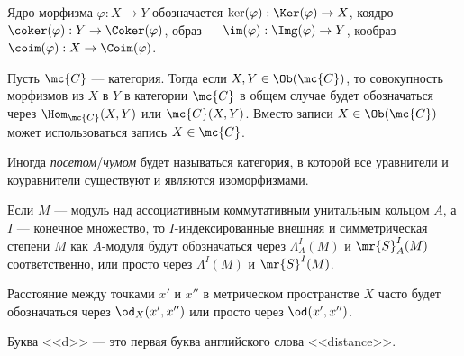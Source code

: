 \documentclass[
	extrafontsizes,
	11pt,
	hyphens,
]{memoir}
\begin{document}
\begin{notation}
Ядро морфизма \(\varphi : X \to Y\) обозначается \(\ker(\varphi) : \Ker(\varphi) \to X\),
коядро --- \(\coker(\varphi) : Y \to \Coker(\varphi)\),
образ --- \(\im(\varphi) : \Img(\varphi) \to Y\),
кообраз --- \(\coim(\varphi) : X \to \Coim(\varphi)\).
\end{notation}

\begin{notation}
Пусть \(\mc{C}\) --- категория. Тогда если \(X,Y \in \Ob(\mc{C})\), то совокупность морфизмов из \(X\) в \(Y\) в категории \(\mc{C}\) в общем случае будет обозначаться через \(\Hom_{\mc{C}}(X,Y)\) или \(\mc{C}(X,Y)\).
Вместо записи \(X \in \Ob(\mc{C})\) может использоваться запись \(X \in \mc{C}\).
\end{notation}


\begin{convention}
Иногда \emph{посетом}/\emph{чумом} будет называться категория, в которой все уравнители и коуравнители существуют и являются изоморфизмами.
\end{convention}

\begin{notation}
Если \(M\) --- модуль над ассоциативным коммутативным унитальным кольцом \(A\), а \(I\) --- конечное множество, то \(I\)-индексированные внешняя и симметрическая степени \(M\) как \(A\)-модуля будут обозначаться через \(\Lambda^I_A(M)\) и \(\mr{S}^I_A(M)\) соответственно, или просто через \(\Lambda^I(M)\) и \(\mr{S}^I(M)\).
\end{notation}

\begin{notation}
Расстояние между точками \(x'\) и \(x''\) в метрическом пространстве \(X\) часто будет обозначаться через \(\od_X(x',x'')\) или просто через \(\od(x',x'')\).
\end{notation}

\begin{remark}
Буква <<\textenglish{d}>> ---  это первая буква английского слова <<\textenglish{distance}>>.
\end{remark}

\end{document}
